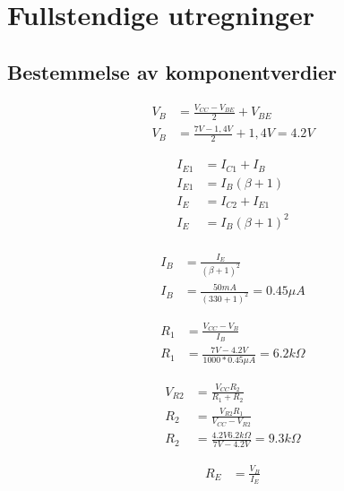 
\appendix
\section{Fullstendige utregninger}\label{ax:math}

\subsection{Bestemmelse av komponentverdier}

\begin{equation}
    \label{eq:arbeidspunkt}
    \begin{split}
    V_B &= \frac{V_{CC} - V_{BE}}{2} + V_{BE}\\
    V_B &= \frac{7V - 1,4V}{2} + 1,4V = 4.2V
    \end{split}
    \end{equation}
    
    \begin{equation}
    \label{eq:IE}
    \begin{split}
    I_{E1} &= I_{C1} + I_{B}\\
    I_{E1} &= I_{B}(\beta + 1)\\
    I_{E} &= I_{C2} + I_{E1}\\
    I_{E} &= I_{B}(\beta + 1)^2 \\
    \end{split}
    \end{equation}
    
    \begin{equation}
    \label{eq:IB}
    \begin{split}
    I_{B} &= \frac{I_{E}}{(\beta + 1)^2} \\
    I_{B} &= \frac{50mA}{(330 + 1)^2} = 0.45\mu A
    \end{split}
    \end{equation}
    
    \begin{equation}
    \label{eq:R1}
    \begin{split}
    R_{1} &= \frac{V_{CC} - V_{B}}{I_{B}}\\
    R_{1} &= \frac{7V - 4.2V}{1000*0.45\mu A} = 6.2k\Omega
    \end{split}
    \end{equation}
    
    \begin{equation}
    \label{eq:R2}
    \begin{split}
    V_{R2} &= \frac{V_{CC} R_2}{R_1 + R_2}\\
    R_2 &= \frac{V_{R2} R_1}{V_{CC}-V_{R2}}\\
    R_2 &= \frac{4.2V 6.2k\Omega}{7V-4.2V} = 9.3k\Omega
    \end{split}
    \end{equation}
    
    \begin{equation}
    \label{eq:RE}
    \begin{split}
    R_{E} &= \frac{V_{B}}{I_{E}}\\ 
    \end{split}
    \end{equation}
    
    